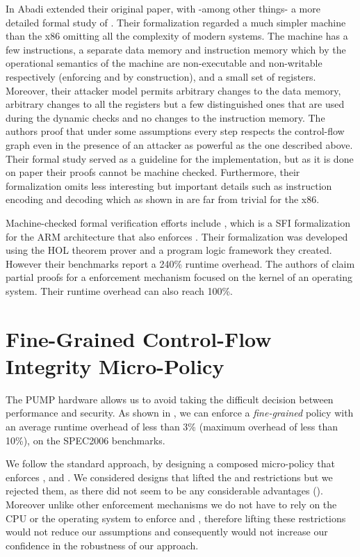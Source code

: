 In \cite{AbadiBEL09} Abadi \ETAL extended their original paper, with
-among other things- a more detailed formal study of \CFI. Their
formalization regarded a much simpler machine than the x86 omitting
all the complexity of modern systems. The machine has a few
instructions, a separate data memory and instruction memory which by
the operational semantics of the machine are non-executable and
non-writable respectively (enforcing \NXD and \NWC by construction),
and a small set of registers. Moreover, their attacker model permits
arbitrary changes to the data memory, arbitrary changes to all the
registers but a few distinguished ones that are used during the
dynamic checks and no changes to the instruction memory.  The authors
proof that under some assumptions every step respects the control-flow
graph even in the presence of an attacker as powerful as the one
described above. Their formal study served as a guideline for the
implementation, but as it is done on paper their proofs cannot be
machine checked. Furthermore, their formalization omits less
interesting but important details such as instruction encoding and
decoding which as shown in \cite{MorrisettTTTG12} are far from trivial
for the x86.

Machine-checked formal verification efforts include \cite{ZhaoLSR11},
which is a SFI formalization for the ARM architecture that also
enforces \CFI. Their formalization was developed using the HOL
theorem prover and a program logic framework they created. However
their benchmarks report a 240\% runtime overhead. The authors of
\cite{CriswellDA14} claim partial proofs for a \CFI enforcement
mechanism focused on the kernel of an operating system. Their runtime
overhead can also reach 100\%.

\section{Fine-Grained Control-Flow Integrity Micro-Policy}\label{sec:cfi_fine}

The PUMP hardware allows us to avoid taking the difficult decision between
performance and security. As shown in \cite{pump_asplos2015}, we can enforce a
\emph{fine-grained} \CFI policy with an average runtime overhead of less than 3\%
(maximum overhead of less than 10\%), on the SPEC2006 benchmarks.

 We follow the standard
approach, by designing a composed micro-policy that enforces \NXD,
\NWC and \CFI.  We considered designs that lifted the \NXD and \NWC
restrictions but we rejected them, as there did not seem to be any
considerable advantages (). Moreover unlike other \CFI
enforcement mechanisms we do not have to rely on the CPU or the
operating system to enforce \NXD and \NWC, therefore lifting these
restrictions would not reduce our assumptions and consequently would
not increase our confidence in the robustness of our approach.

